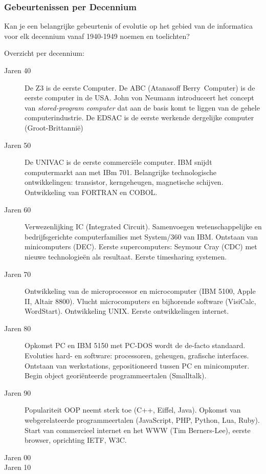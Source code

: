 \documentclass[../main.tex]{subfiles}
\begin{document}
\subsubsection{Gebeurtenissen per Decennium}
\begin{question}
Kan je een belangrijke gebeurtenis of evolutie op het gebied van de informatica voor elk decennium vanaf 1940-1949 noemen en toelichten?
\end{question}
\begin{solution}
Overzicht per decennium:
\begin{description}
	\item[Jaren 40] De Z3 is de eerste Computer. De ABC (Atanasoff Berry Computer) is de eerste computer in de USA. John von Neumann introduceert het concept van \emph{stored-program computer} dat aan de basis komt te liggen van de gehele computerindustrie. De EDSAC is de eerste werkende dergelijke computer (Groot-Brittanni\"e)
	\item[Jaren 50] De UNIVAC is de eerste commerciële computer. IBM snijdt computermarkt aan met IBm 701. Belangrijke technologische ontwikkelingen: transistor, kerngeheugen, magnetische schijven. Ontwikkeling van FORTRAN en COBOL.
	\item[Jaren 60] Verwezenlijking IC (Integrated Circuit). Samenvoegen wetenschappelijke en bedrijfsgerichte computerfamilies met System/360 van IBM. Ontstaan van minicomputers (DEC). Eerste supercomputers: Seymour Cray (CDC) met nieuwe technologie\"en als resultaat. Eerste timesharing systemen.
	\item[Jaren 70] Ontwikkeling van de microprocessor en microcomputer (IBM 5100, Apple II, Altair 8800). Vlucht microcomputers en bijhorende software (VisiCalc, WordStart). Ontwikkeling UNIX. Eerste ontwikkelingen internet.
	\item[Jaren 80] Opkomst PC en IBM 5150 met PC-DOS wordt de de-facto standaard. Evoluties hard- en software: processoren, geheugen, grafische interfaces. Ontstaan van werkstations, gepositioneerd tussen PC en minicomputer. Begin object geori\"enteerde programmeertalen (Smalltalk).
	\item[Jaren 90] Populariteit OOP neemt sterk toe (C++, Eiffel, Java). Opkomst van webgerelateerde programmeertalen (JavaScript, PHP, Python, Lua, Ruby). Start van commercieel internet en het WWW (Tim Berners-Lee), eerste browser, oprichting IETF, W3C.
	\item[Jaren 00]
	\item[Jaren 10]
\end{description}
\end{solution}
\end{document}
